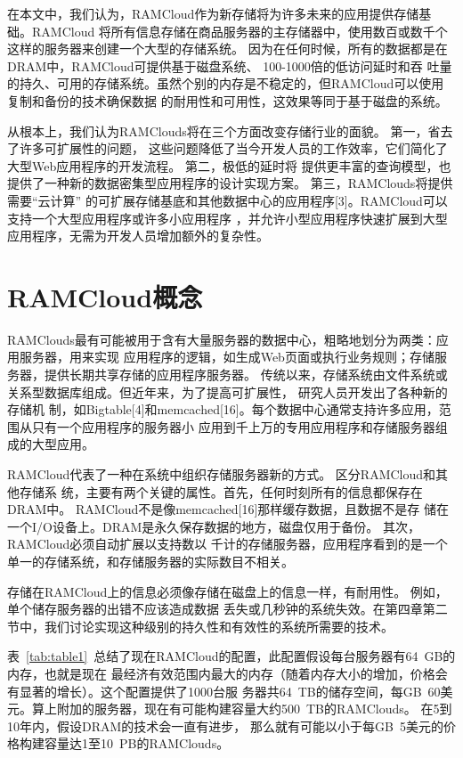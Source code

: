 \documentclass[translation]{zjutreport}
\begin{document}
在本文中，我们认为，RAMCloud作为新存储将为许多未来的应用提供存储基础。RAMCloud
将所有信息存储在商品服务器的主存储器中，使用数百或数千个这样的服务器来创建一个大型的存储系统。
因为在任何时候，所有的数据都是在DRAM中，RAMCloud可提供基于磁盘系统、
100-1000倍的低访问延时和吞
吐量的持久、可用的存储系统。虽然个别的内存是不稳定的，但RAMCloud可以使用复制和备份的技术确保数据
的耐用性和可用性，这效果等同于基于磁盘的系统。

从根本上，我们认为RAMClouds将在三个方面改变存储行业的面貌。
第一，省去了许多可扩展性的问题，
这些问题降低了当今开发人员的工作效率，它们简化了大型Web应用程序的开发流程。
第二，极低的延时将
提供更丰富的查询模型，也提供了一种新的数据密集型应用程序的设计实现方案。
第三，RAMClouds将提供需要“云计算”
的可扩展存储基底和其他数据中心的应用程序[3]。RAMCloud可以支持一个大型应用程序或许多小应用程序
，并允许小型应用程序快速扩展到大型应用程序，无需为开发人员增加额外的复杂性。


\chapter{RAMCloud概念}
RAMClouds最有可能被用于含有大量服务器的数据中心，粗略地划分为两类：应用服务器，用来实现
应用程序的逻辑，如生成Web页面或执行业务规则；存储服务器，提供长期共享存储的应用程序服务器。
传统以来，存储系统由文件系统或关系型数据库组成。但近年来，为了提高可扩展性，
研究人员开发出了各种新的存储机
制，如Bigtable[4]和memcached[16]。每个数据中心通常支持许多应用，范围从只有一个应用程序的服务器小
应用到千上万的专用应用程序和存储服务器组成的大型应用。

RAMCloud代表了一种在系统中组织存储服务器新的方式。
区分RAMCloud和其他存储系
统，主要有两个关键的属性。首先，任何时刻所有的信息都保存在DRAM中。
RAMCloud不是像memcached[16]那样缓存数据，且数据不是存
储在一个I/O设备上。DRAM是永久保存数据的地方，磁盘仅用于备份。
其次，RAMCloud必须自动扩展以支持数以
千计的存储服务器，应用程序看到的是一个单一的存储系统，和存储服务器的实际数目不相关。

存储在RAMCloud上的信息必须像存储在磁盘上的信息一样，有耐用性。
例如，单个储存服务器的出错不应该造成数据
丢失或几秒钟的系统失效。在第四章第二节中，我们讨论实现这种级别的持久性和有效性的系统所需要的技术。

表~\ref{tab:table1}~总结了现在RAMCloud的配置，此配置假设每台服务器有64~GB的内存，也就是现在
最经济有效范围内最大的内存（随着内存大小的增加，价格会有显著的增长）。这个配置提供了1000台服
务器共64~TB的储存空间，每GB~60美元。算上附加的服务器，现在有可能构建容量大约500~TB的RAMClouds。
在5到10年内，假设DRAM的技术会一直有进步，
那么就有可能以小于每GB~5美元的价格构建容量达1至10~PB的RAMClouds。
\end{document}
